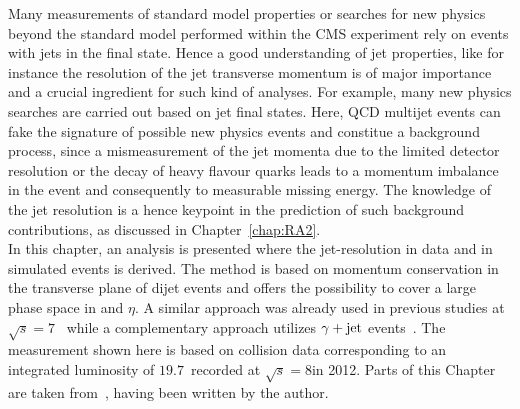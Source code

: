 Many measurements of standard model properties or searches for new physics beyond the standard model performed within the CMS experiment rely on events with jets in the final state. Hence a good understanding of jet properties, like for instance the resolution of the jet transverse momentum is of major importance and a crucial ingredient for such kind of analyses. For example, many new physics searches are carried out based on jet final states. Here, QCD multijet events can fake the signature of possible new physics events and constitue a background process, since a mismeasurement of the jet momenta due to the limited detector resolution or the decay of heavy flavour quarks leads to a momentum imbalance in the event and consequently to measurable missing energy. The knowledge of the jet resolution is a hence keypoint in the prediction of such background contributions, as discussed in Chapter~\ref{chap:RA2}. \\
In this chapter, an analysis is presented where the jet-\pt resolution in data and in simulated events is derived. The method is based on momentum conservation in the transverse plane of dijet events and offers the possibility to cover a large phase space in \pt and $\eta$. A similar approach was already used in previous studies at $\sqrt{s}=7$\tev~\cite{1748-0221-6-11-P11002, thesis:Schroeder} while a complementary approach utilizes $\gamma +\rm{jet}$ events~\cite{CMS-AN-2010-141, CMS-AN-2011-004, CMS-AN-2013-179}. The measurement shown here is based on collision data corresponding to an integrated luminosity of $19.7$~\fbinv recorded at $\sqrt{s}=8$\tev in 2012. Parts of this Chapter are taken from~\cite{bib:AN2013-416}, having been written by the author.   
